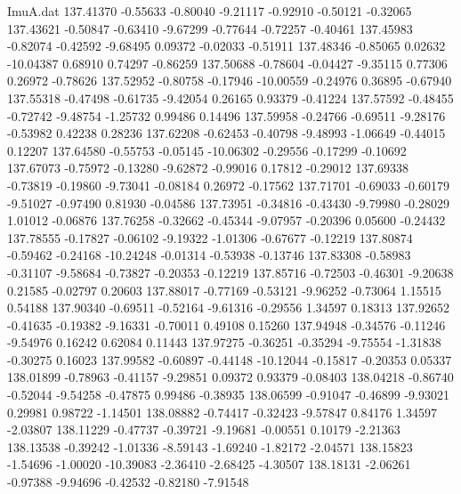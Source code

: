 \begin{filecontents}{ImuA.dat}
 137.41370   -0.55633   -0.80040   -9.21117   -0.92910   -0.50121   -0.32065
 137.43621   -0.50847   -0.63410   -9.67299   -0.77644   -0.72257   -0.40461
 137.45983   -0.82074   -0.42592   -9.68495    0.09372   -0.02033   -0.51911
 137.48346   -0.85065    0.02632  -10.04387    0.68910    0.74297   -0.86259
 137.50688   -0.78604   -0.04427   -9.35115    0.77306    0.26972   -0.78626
 137.52952   -0.80758   -0.17946  -10.00559   -0.24976    0.36895   -0.67940
 137.55318   -0.47498   -0.61735   -9.42054    0.26165    0.93379   -0.41224
 137.57592   -0.48455   -0.72742   -9.48754   -1.25732    0.99486    0.14496
 137.59958   -0.24766   -0.69511   -9.28176   -0.53982    0.42238    0.28236
 137.62208   -0.62453   -0.40798   -9.48993   -1.06649   -0.44015    0.12207
 137.64580   -0.55753   -0.05145  -10.06302   -0.29556   -0.17299   -0.10692
 137.67073   -0.75972   -0.13280   -9.62872   -0.99016    0.17812   -0.29012
 137.69338   -0.73819   -0.19860   -9.73041   -0.08184    0.26972   -0.17562
 137.71701   -0.69033   -0.60179   -9.51027   -0.97490    0.81930   -0.04586
 137.73951   -0.34816   -0.43430   -9.79980   -0.28029    1.01012   -0.06876
 137.76258   -0.32662   -0.45344   -9.07957   -0.20396    0.05600   -0.24432
 137.78555   -0.17827   -0.06102   -9.19322   -1.01306   -0.67677   -0.12219
 137.80874   -0.59462   -0.24168  -10.24248   -0.01314   -0.53938   -0.13746
 137.83308   -0.58983   -0.31107   -9.58684   -0.73827   -0.20353   -0.12219
 137.85716   -0.72503   -0.46301   -9.20638    0.21585   -0.02797    0.20603
 137.88017   -0.77169   -0.53121   -9.96252   -0.73064    1.15515    0.54188
 137.90340   -0.69511   -0.52164   -9.61316   -0.29556    1.34597    0.18313
 137.92652   -0.41635   -0.19382   -9.16331   -0.70011    0.49108    0.15260
 137.94948   -0.34576   -0.11246   -9.54976    0.16242    0.62084    0.11443
 137.97275   -0.36251   -0.35294   -9.75554   -1.31838   -0.30275    0.16023
 137.99582   -0.60897   -0.44148  -10.12044   -0.15817   -0.20353    0.05337
 138.01899   -0.78963   -0.41157   -9.29851    0.09372    0.93379   -0.08403
 138.04218   -0.86740   -0.52044   -9.54258   -0.47875    0.99486   -0.38935
 138.06599   -0.91047   -0.46899   -9.93021    0.29981    0.98722   -1.14501
 138.08882   -0.74417   -0.32423   -9.57847    0.84176    1.34597   -2.03807
 138.11229   -0.47737   -0.39721   -9.19681   -0.00551    0.10179   -2.21363
 138.13538   -0.39242   -1.01336   -8.59143   -1.69240   -1.82172   -2.04571
 138.15823   -1.54696   -1.00020  -10.39083   -2.36410   -2.68425   -4.30507
 138.18131   -2.06261   -0.97388   -9.94696   -0.42532   -0.82180   -7.91548

\end{filecontents}
